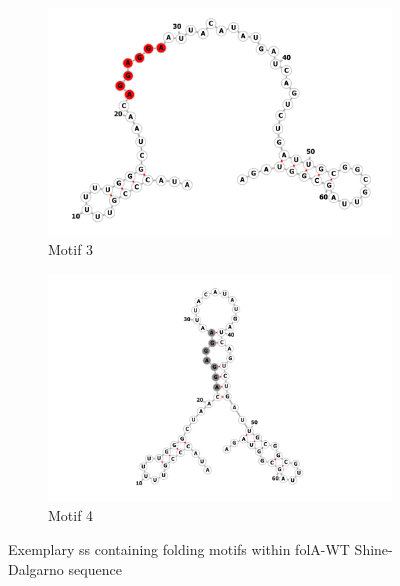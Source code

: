 \documentclass[11pt, a4paper]{article}
\begin{document}
\begin{figure}
\begin{subfigure}[b]{0.475\textwidth}
    	\includegraphics[width=\textwidth]{folding_example_red}
   		\caption[]%
   		{{\small Motif 3}}    
    	\label{fig:mean and std of net34}
    \end{subfigure}
   	\quad
   	\begin{subfigure}[b]{0.475\textwidth}   
   		\centering 
    	\includegraphics[width=\textwidth]{folding_example_grey}
    	\caption[]%
   		{{\small Motif 4}}    
   		\label{fig:mean and std of net44}
   	\end{subfigure}
    \caption[ Exemplary ss containing folding motifs within folA-WT Shine-Dalgarno sequence ]
   	{\small Exemplary ss containing folding motifs within folA-WT Shine-Dalgarno sequence} 
   	\label{fig:local_foldings}
\end{figure}
\end{document}

